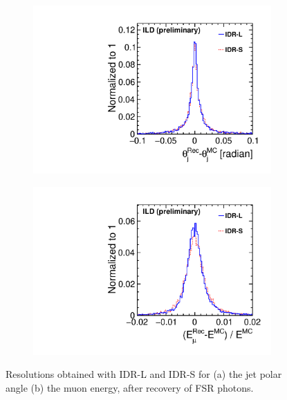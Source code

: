 \begin{figure}[htbp]
\begin{subfigure}{0.49\hsize} \includegraphics[width=\textwidth]{Performance/fig/thetaj1h.pdf}
 \caption{  \label{fig:mh:res:theta}}
 \end{subfigure}
\begin{subfigure}{0.49\hsize} \includegraphics[width=\textwidth]{Performance/fig/elep1.pdf}
 \caption{  \label{fig:mh:res:Elep}}
 \end{subfigure}
\caption{Resolutions obtained with IDR-L and IDR-S for 
(a) the jet polar angle
(b) the muon energy, after recovery of FSR photons. 
}
\label{fig:mh:res:etheta}
\end{figure}

